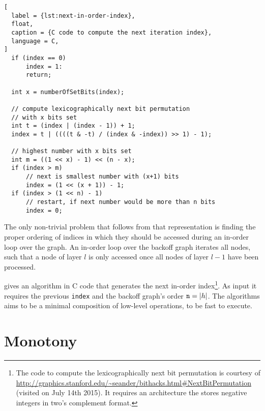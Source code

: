 \begin{lstlisting}[
  label = {lst:next-in-order-index},
  float,
  caption = {C code to compute the next iteration index},
  language = C,
]
  if (index == 0)
      index = 1:
      return;

  int x = numberOfSetBits(index);

  // compute lexicographically next bit permutation
  // with x bits set
  int t = (index | (index - 1)) + 1;
  index = t | ((((t & -t) / (index & -index)) >> 1) - 1);

  // highest number with x bits set
  int m = ((1 << x) - 1) << (n - x);
  if (index > m)
      // next is smallest number with (x+1) bits
      index = (1 << (x + 1)) - 1;
  if (index > (1 << n) - 1)
      // restart, if next number would be more than n bits
      index = 0;
\end{lstlisting}

The only non-trivial problem that follows from that representation is finding
the proper ordering of indices in which they should be accessed during an
in-order loop over the graph.
An in-order loop over the backoff graph iterates all nodes, such that a node
of layer $l$ is only accessed once all nodes of layer $l-1$ have been processed.

 gives an algorithm in C code that generates the
next in-order index\footnote{The code to compute the lexicographically next bit
permutation is courtesy of
\mbox{\url{http://graphics.stanford.edu/~seander/bithacks.html\#NextBitPermutation}}
(visited on July 14th 2015).
It requires an architecture the stores negative integers in two's complement
format.}.
As input it requires the previous \texttt{index} and the backoff graph's order
$\texttt{n} = {\left|h\right|}$.
The algorithms aims to be a minimal composition of low-level operations, to be
fast to execute.

\section{Monotony}


